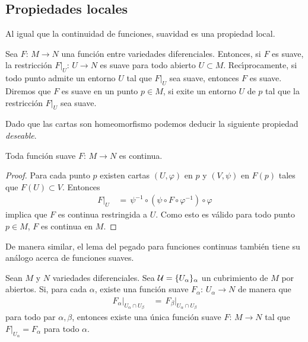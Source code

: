 \subsection{Propiedades locales}
Al igual que la continuidad de funciones, suavidad es una propiedad
local.

\begin{propoSuavidadEsLocal}%
	\label{thm:suavidadeslocal}
	Sea $F:\,M\rightarrow N$ una funci\'{o}n entre variedades
	diferenciales. Entonces, si $F$ es suave, la restricci\'{o}n
	$F|_{U}:\,U\rightarrow N$ es suave para todo abierto $U\subset M$.
	Rec\'{\i}procamente, si todo punto admite un entorno $U$ tal que
	$F|_{U}$ sea suave, entonces $F$ es suave. Diremos que $F$ es suave
	en un punto $p\in M$, si exite un entorno $U$ de $p$ tal que la
	restricci\'{o}n $F|_{U}$ sea suave.
\end{propoSuavidadEsLocal}

Dado que las cartas son homeomorfismo podemos deducir la siguiente propiedad
\emph{deseable}.

\begin{propoSuaveEsConti}\label{thm:suaveesconti}
	Toda funci\'{o}n suave $F:\,M\rightarrow N$ es continua.
\end{propoSuaveEsConti}

\begin{proof}
	Para cada punto $p$ existen cartas $(U,\varphi)$ en $p$ y $(V,\psi)$
	en $F(p)$ tales que $F(U)\subset V$. Entonces
	\begin{align*}
		F|_{U} & \,=\,\psi^{-1}\circ (\psi\circ F\circ\varphi^{-1})
			\circ\varphi
	\end{align*}
	implica que $F$ es continua restringida a $U$. Como esto es
	v\'{a}lido para todo punto $p\in M$, $F$ es continua en $M$.
\end{proof}

De manera similar, el lema del pegado para funciones continuas tambi\'{e}n
tiene su an\'{a}logo acerca de funciones suaves.

\begin{propoDelPegado}\label{thm:delpegado}
	Sean $M$ y $N$ variedades diferenciales. Sea
	$\cal{U}=\{U_{\alpha}\}_{\alpha}$ un cubrimiento de $M$ por abiertos.
	Si, para cada $\alpha$, existe una funci\'{o}n suave
	$F_{\alpha}:\,U_{\alpha}\rightarrow N$ de manera que
	\begin{align*}
		F_{\alpha}|_{U_{\alpha}\cap U_{\beta}} & \,=\,
			F_{\beta}|_{U_{\alpha}\cap U_{\beta}}
	\end{align*}
	para todo par $\alpha,\beta$, entonces existe una \'{u}nica funci\'{o}n
	suave $F:\,M\rightarrow N$ tal que $F|_{U_{\alpha}}=F_{\alpha}$
	para todo $\alpha$.
\end{propoDelPegado}

